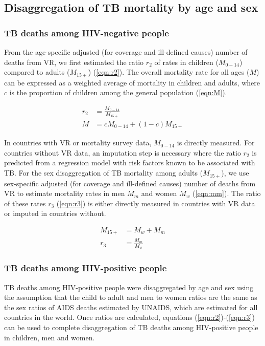 \subsection{Disaggregation of TB mortality by age and sex}

\subsubsection{TB deaths among HIV-negative people}

From the age-specific adjusted (for coverage and ill-defined causes) number of deaths from VR, we first estimated the ratio $r_2$ of rates in children ($M_{0-14}$) compared to adults ($M_{15+}$) (\ref{eqn:r2}). The overall mortality rate for all ages ($M$) can be expressed as a weighted average of mortality in children and adults, where $c$ is the proportion of children among the general population (\ref{eqn:M}).

\begin{subequation}
\begin{align}
r_2 &= \frac{M_{0-14}}{M_{15+}} \label{eqn:r2} \\
M &= c M_{0-14} + (1 - c) M_{15+} \label{eqn:M}
\end{align}
\end{subequation}

In countries with VR or mortality survey data, $M_{0-14}$ is directly measured. For countries without VR data, an imputation step is necessary where the ratio $r_2$ is predicted from a regression model with risk factors known to be associated with TB. For the sex disaggregation of TB mortality among adults ($M_{15+}$), we use sex-specific adjusted (for coverage and ill-defined causes) number of deaths from VR to estimate mortality rates in men $M_m$  and women $M_w$ (\ref{eqn:mm}). The ratio of these rates $r_3$ (\ref{eqn:r3}) is either directly measured in countries with VR data or imputed in countries without.

\begin{equation}
\begin{align}
M_{15+} &= M_w + M_m \label{eqn:mm} \\
r_3 &= \frac{M_m}{M_w} \label{eqn:r3}
\end{align}
\end{equation}


\subsubsection{TB deaths among HIV-positive people}

TB deaths among HIV-positive people were disaggregated by age and sex using the assumption that the child to adult and men to women ratios are the same as the sex ratios of AIDS deaths estimated by UNAIDS, which are estimated for all countries in the world. Once ratios are calculated, equations (\ref{eqn:r2})-(\ref{eqn:r3}) can be used to complete disaggregation of TB deaths among HIV-positive people in children, men and women.
